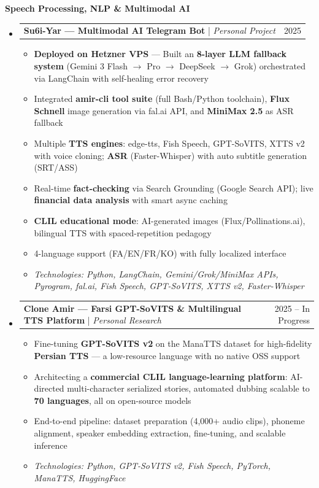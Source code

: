\documentclass[11pt,a4paper]{article}
\makeatletter
\newcommand{\subspace}{\vspace{0.5em}}
\newcommand{\cvsubsection}[1]{
    \subspace
    \noindent\textcolor{primary}{\large \textbf{#1}}
    \par\vspace{0.3em}
}
\newcommand{\headerrow}[2]{
    \begin{tabular*}{\linewidth}{l@{\extracolsep{\fill}}r}
    #1 & \textcolor{primary}{#2} \\
    \end{tabular*}
}
\makeatother
\begin{document}
\cvsubsection{Speech Processing, NLP \& Multimodal AI}
\begin{itemize}[leftmargin=1em, label={}]
    \item
    \headerrow{\textbf{Su6i-Yar — Multimodal AI Telegram Bot} | \emph{Personal Project}}{2025}
    \begin{itemize}[leftmargin=1.5em, label=$\bullet$, nosep]
        \item \textbf{Deployed on Hetzner VPS} — Built an \textbf{8-layer LLM fallback system} (Gemini 3 Flash $\rightarrow$ Pro $\rightarrow$ DeepSeek $\rightarrow$ Grok) orchestrated via LangChain with self-healing error recovery
        \item Integrated \textbf{amir-cli tool suite} (full Bash/Python toolchain), \textbf{Flux Schnell} image generation via fal.ai API, and \textbf{MiniMax 2.5} as ASR fallback
        \item Multiple \textbf{TTS engines}: edge-tts, Fish Speech, GPT-SoVITS, XTTS v2 with voice cloning; \textbf{ASR} (Faster-Whisper) with auto subtitle generation (SRT/ASS)
        \item Real-time \textbf{fact-checking} via Search Grounding (Google Search API); live \textbf{financial data analysis} with smart async caching
        \item \textbf{CLIL educational mode}: AI-generated images (Flux/Pollinations.ai), bilingual TTS with spaced-repetition pedagogy
        \item 4-language support (FA/EN/FR/KO) with fully localized interface
        \item \emph{Technologies: Python, LangChain, Gemini/Grok/MiniMax APIs, Pyrogram, fal.ai, Fish Speech, GPT-SoVITS, XTTS v2, Faster-Whisper}
    \end{itemize}

    \clearpage
    \subspace 
    \item
    \headerrow{\textbf{Clone Amir — Farsi GPT-SoVITS \& Multilingual TTS Platform} | \emph{Personal Research}}{2025 -- In Progress}
    \begin{itemize}[leftmargin=1.5em, label=$\bullet$, nosep]
        \item Fine-tuning \textbf{GPT-SoVITS v2} on the ManaTTS dataset for high-fidelity \textbf{Persian TTS} — a low-resource language with no native OSS support
        \item Architecting a \textbf{commercial CLIL language-learning platform}: AI-directed multi-character serialized stories, automated dubbing scalable to \textbf{70 languages}, all on open-source models
        \item End-to-end pipeline: dataset preparation (4,000+ audio clips), phoneme alignment, speaker embedding extraction, fine-tuning, and scalable inference
        \item \emph{Technologies: Python, GPT-SoVITS v2, Fish Speech, PyTorch, ManaTTS, HuggingFace}
    \end{itemize}


\end{itemize}
\end{document}

